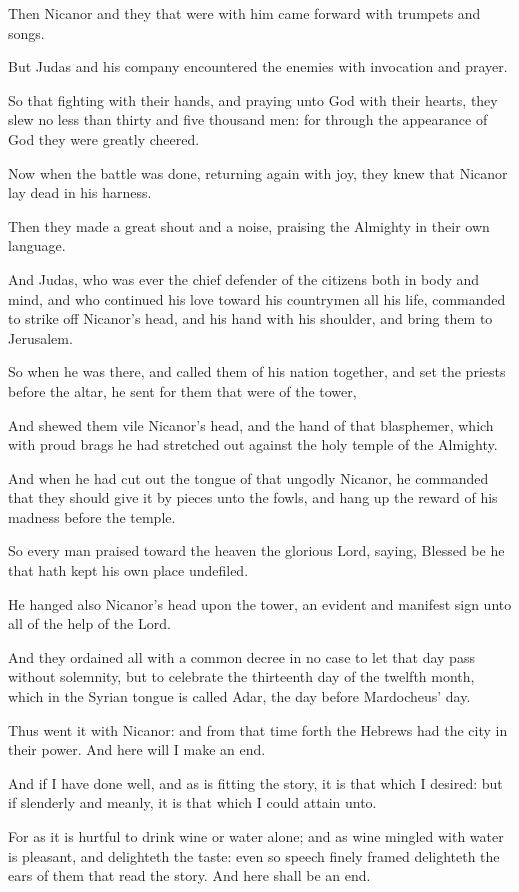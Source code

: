 {\par }{\PP {}Then Nicanor and they that were with him came forward with trumpets and songs.
\par }{\PP {}But Judas and his company encountered the enemies with invocation and prayer.
\par }{\PP {}So that fighting with their hands, and praying unto God with their hearts, they slew no less than thirty and five thousand men: for through the appearance of God they were greatly cheered.
\par }{\PP {}Now when the battle was done, returning again with joy, they knew that Nicanor lay dead in his harness.
\par }{\PP {}Then they made a great shout and a noise, praising the Almighty in their own language.
\par }{\PP {}And Judas, who was ever the chief defender of the citizens both in body and mind, and who continued his love toward his countrymen all his life, commanded to strike off Nicanor’s head, and his hand with his shoulder, and bring them to Jerusalem.
\par }{\PP {}So when he was there, and called them of his nation together, and set the priests before the altar, he sent for them that were of the tower,
\par }{\PP {}And shewed them vile Nicanor’s head, and the hand of that blasphemer, which with proud brags he had stretched out against the holy temple of the Almighty.
\par }{\PP {}And when he had cut out the tongue of that ungodly Nicanor, he commanded that they should give it by pieces unto the fowls, and hang up the reward of his madness before the temple.
\par }{\PP {}So every man praised toward the heaven the glorious Lord, saying, Blessed be he that hath kept his own place undefiled.
\par }{\PP {}He hanged also Nicanor’s head upon the tower, an evident and manifest sign unto all of the help of the Lord.
\par }{\PP {}And they ordained all with a common decree in no case to let that day pass without solemnity, but to celebrate the thirteenth day of the twelfth month, which in the Syrian tongue is called Adar, the day before Mardocheus’ day.
\par }{\PP {}Thus went it with Nicanor: and from that time forth the Hebrews had the city in their power. And here will I make an end.
\par }{\PP {}And if I have done well, and as is fitting the story, it is that which I desired: but if slenderly and meanly, it is that which I could attain unto.
\par }{\PP {}For as it is hurtful to drink wine or water alone; and as wine mingled with water is pleasant, and delighteth the taste: even so speech finely framed delighteth the ears of them that read the story. And here shall be an end.
\par }